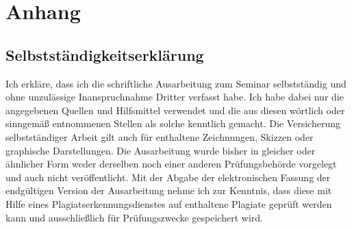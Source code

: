 \documentclass[11pt,a4paper]{article}
\begin{document}

\newpage
\section{Anhang}
\subsection{Selbstständigkeitserklärung}

Ich erkläre, dass ich die schriftliche Ausarbeitung zum Seminar selbstständig
und ohne unzulässige Inanspruchnahme Dritter verfasst habe. Ich habe dabei nur
die angegebenen Quellen und Hilfsmittel verwendet und die aus diesen wörtlich
oder sinngemäß entnommenen Stellen als solche kenntlich gemacht. Die Versicherung
selbstständiger Arbeit gilt auch für enthaltene Zeichnungen, Skizzen oder
graphische Darstellungen. Die Ausarbeitung wurde bisher in gleicher oder ähnlicher
Form weder derselben noch einer anderen Prüfungsbehörde vorgelegt und auch nicht
veröffentlicht. Mit der Abgabe der elektronischen Fassung der endgültigen Version
der Ausarbeitung nehme ich zur Kenntnis, dass diese mit Hilfe eines
Plagiatserkennungsdienstes auf enthaltene Plagiate geprüft werden kann und
ausschließlich für Prüfungszwecke gespeichert wird.

\newpage
\printbibliography
\end{document}
